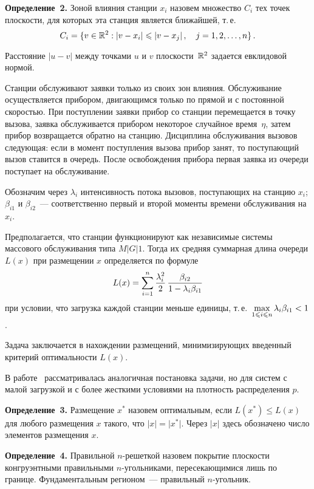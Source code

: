 \begin{multicols}{2}
\textbf{Определение~2.} Зоной влияния станции $x_i$ назовем множество $C_i$ тех точек
плоскости, для которых эта станция является ближайшей, т.\,е.\
$$
C_i=\{v\in\mathbb{R}^2:\vert v-x_i\vert \leqslant\vert v-x_j\vert\,,\quad j=1,2,\ldots,n\}\,.
$$

Расстояние $\vert u-v\vert $ между точками $u$ и $v$ 
плос\-кости~$\mathbb{R}^2$ задается евклидовой нормой.

Станции обслуживают заявки только из своих зон влияния. Обслуживание осуществляется прибором,
двигающимся только по прямой и с постоянной скоростью. При поступлении заявки прибор со
станции перемещается в точку вызова, заявка обслуживается прибором некоторое случайное 
время~$\eta$, затем прибор возвращается обратно на станцию. Дисциплина обслуживания вызовов
следующая: если в момент поступления вызова прибор занят, то поступающий вызов ставится в
очередь. После освобождения прибора первая заявка из очереди поступает на обслуживание.

Обозначим через $\lambda_i$ интенсивность потока вызовов, поступающих на станцию $x_i$;
$\beta_{i1}$ и $\beta_{i2}$~--- соответственно первый и второй моменты времени обслуживания на
$x_i$.

Предполагается, что станции функционируют как независимые системы
массового обслуживания типа $M\vert G\vert 1$. Тогда их средняя суммарная
длина очереди $L(x)$ при размещении $x$ 
определяется по формуле
\begin{equation*}
L(x)=\sum\limits_{i=1}^{n}\displaystyle\frac{\displaystyle \lambda_i^2\mathstrut}{\displaystyle 2\mathstrut}\, \displaystyle\frac{\displaystyle \beta_{i2}\mathstrut}{\displaystyle 1-\lambda_i \beta_{i1}\mathstrut}
\end{equation*}
при условии, что загрузка каждой станции меньше единицы, т.\,е.\
$\max\limits_{1\leqslant i\leqslant n} \lambda_i \beta_{i1}< 1 $.

Задача заключается в нахождении размещений, минимизирующих введенный критерий оптимальности
$L(x)$.

В работе~\cite{1z} рассматривалась аналогичная постановка задачи,
но для систем с малой загрузкой и с более жесткими условиями на
плотность распределения $p$.

\textbf{Определение~3.} Размещение $x^*$ назовем оптимальным, если
$L(x^*)\leqslant L(x)$ для
любого размещения $x$ такого, что $\vert x\vert =\vert x^*\vert$.
Через $\vert x\vert$ здесь обозначено число элементов
размещения $x$.

\textbf{Определение~4.} Правильной $n$-решеткой назовем покрытие плоскости конгруэнтными
правильными $n$-угольниками, пересекающимися лишь по границе. Фундаментальным регионом~---
правильный $n$-угольник.


\end{multicols}
